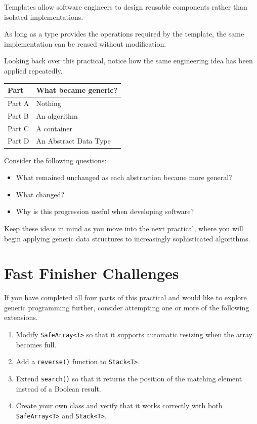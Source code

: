 \documentclass{csc2059practical}
\begin{document}
\begin{importantnote}
Templates allow software engineers to design reusable components rather than isolated implementations.

As long as a type provides the operations required by the template, the same implementation can be reused without modification.
\end{importantnote}

\begin{reflectionbox}
Looking back over this practical, notice how the same engineering idea has been applied repeatedly.

\begin{center}
\begin{tabular}{ll}
\toprule
\textbf{Part} & \textbf{What became generic?} \\
\midrule
Part A & Nothing \\
Part B & An algorithm \\
Part C & A container \\
Part D & An Abstract Data Type \\
\bottomrule
\end{tabular}
\end{center}

Consider the following questions:

\begin{itemize}
    \item What remained unchanged as each abstraction became more general?
    \item What changed?
    \item Why is this progression useful when developing software?
\end{itemize}

Keep these ideas in mind as you move into the next practical, where you will begin applying generic data structures to increasingly sophisticated algorithms.
\end{reflectionbox}


\section{Fast Finisher Challenges}

If you have completed all four parts of this practical and would like to explore generic programming further, consider attempting one or more of the following extensions.

\begin{enumerate}
    \item Modify \texttt{SafeArray<T>} so that it supports automatic resizing when the array becomes full.
    \item Add a \texttt{reverse()} function to \texttt{Stack<T>}.
    \item Extend \texttt{search()} so that it returns the position of the matching element instead of a Boolean result.
    \item Create your own class and verify that it works correctly with both \texttt{SafeArray<T>} and \texttt{Stack<T>}.
\end{enumerate}
\end{document}
